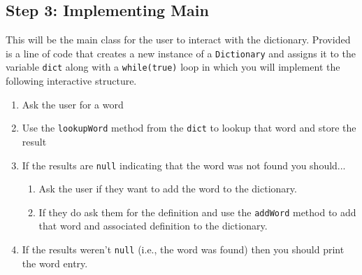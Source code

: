\documentclass[a4paper]{article}
\begin{document}
\subsection{Step 3: Implementing Main} This will be the main class for
the user to interact with the dictionary. Provided is a line of code that
creates a new instance of a \lstinline|Dictionary| and assigns it to the
variable \lstinline|dict| along with a \lstinline|while(true)| loop in which
you will implement the following interactive structure.
\begin{enumerate}
    \item Ask the user for a word
    \item Use the \lstinline|lookupWord| method from the \lstinline|dict| to lookup that word and store the result
    \item If the results are \lstinline|null| indicating that the word was not found you should...
        \begin{enumerate}
            \item Ask the user if they want to add the word to the dictionary. 
            \item If they do ask them for the definition and use the \lstinline|addWord| method to add that word and associated definition to the dictionary.
        \end{enumerate}
    \item If the results weren't \lstinline|null| (i.e., the word was found) then you should print the word entry.
\end{enumerate}
\end{document}
